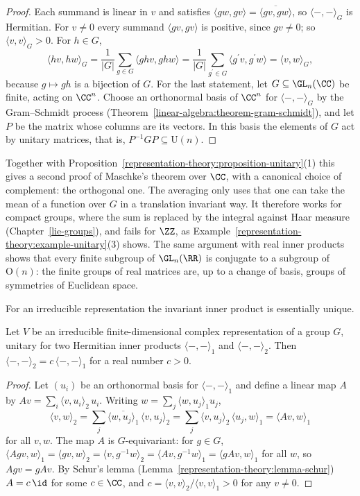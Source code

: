 \begin{proof}
Each summand is linear in $v$ and satisfies $\langle gw, gv\rangle = \overline{\langle gv, gw\rangle}$, so $\langle -, - \rangle_G$ is Hermitian. For $v \neq 0$ every summand
$\langle gv, gv\rangle$ is positive, since $gv \neq 0$; so $\langle v, v\rangle_G > 0$. For $h \in G$,
\[
\langle hv, hw\rangle_G = \frac{1}{|G|}\sum_{g \in G}\langle ghv, ghw\rangle = \frac{1}{|G|}\sum_{g^{\prime} \in G}\langle g^{\prime}v, g^{\prime}w\rangle = \langle v, w\rangle_G,
\]
because $g \mapsto gh$ is a bijection of $G$. For the last statement, let $G \subseteq \GL_n(\CC)$ be finite, acting on $\CC^n$. Choose an orthonormal basis of $\CC^n$ for
$\langle -, - \rangle_G$ by the Gram--Schmidt process (Theorem~\ref{linear-algebra:theorem-gram-schmidt}), and let $P$ be the matrix whose columns are its vectors. In this basis the elements of
$G$ act by unitary matrices, that is, $P^{-1}GP \subseteq \mathrm{U}(n)$.
\end{proof}

Together with Proposition~\ref{representation-theory:proposition-unitary}(1) this gives a second proof of Maschke's theorem over $\CC$, with a canonical choice of complement: the orthogonal
one. The averaging only uses that one can take the mean of a function over $G$ in a translation invariant way. It therefore works for compact groups, where the sum is replaced by the integral
against Haar measure (Chapter~\ref{lie-groups}), and fails for $\ZZ$, as Example~\ref{representation-theory:example-unitary}(3) shows. The same argument with real inner products shows
that every finite subgroup of $\GL_n(\RR)$ is conjugate to a subgroup of $\mathrm{O}(n)$: the finite groups of real matrices are, up to a change of basis, groups of symmetries of Euclidean space.

For an irreducible representation the invariant inner product is essentially unique.

\begin{proposition}\label{representation-theory:proposition-unitary-unique}
Let $V$ be an irreducible finite-dimensional complex representation of a group $G$, unitary for two Hermitian inner products $\langle -, - \rangle_1$ and $\langle -, - \rangle_2$. Then
$\langle -, - \rangle_2 = c\,\langle -, - \rangle_1$ for a real number $c > 0$.
\end{proposition}

\begin{proof}
Let $(u_i)$ be an orthonormal basis for $\langle -, - \rangle_1$ and define a linear map $A$ by $Av = \sum_i\langle v, u_i\rangle_2\,u_i$. Writing $w = \sum_j\langle w, u_j\rangle_1u_j$,
\[
\langle v, w\rangle_2 = \sum_j\overline{\langle w, u_j\rangle_1}\,\langle v, u_j\rangle_2 = \sum_j\langle v, u_j\rangle_2\,\langle u_j, w\rangle_1 = \langle Av, w\rangle_1
\]
for all $v, w$. The map $A$ is $G$-equivariant: for $g \in G$,
$\langle Agv, w\rangle_1 = \langle gv, w\rangle_2 = \langle v, g^{-1}w\rangle_2 = \langle Av, g^{-1}w\rangle_1 = \langle gAv, w\rangle_1$ for all $w$, so $Agv = gAv$. By Schur's lemma
(Lemma~\ref{representation-theory:lemma-schur}) $A = c\,\id$ for some $c \in \CC$, and $c = \langle v, v\rangle_2/\langle v, v\rangle_1 > 0$ for any $v \neq 0$.
\end{proof}

